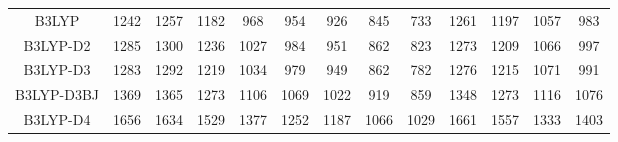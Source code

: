 \begin{table}[ht]
\begin{tabular}{ccccccccccccc}
B3LYP & 1242 & 1257 & 1182 & 968 & 954 & 926 & 845 & 733 & 1261 & 1197 & 1057 & 983 \\ 
B3LYP-D2 & 1285 & 1300 & 1236 & 1027 & 984 & 951 & 862 & 823 & 1273 & 1209 & 1066 & 997 \\ 
B3LYP-D3 & 1283 & 1292 & 1219 & 1034 & 979 & 949 & 862 & 782 & 1276 & 1215 & 1071 & 991 \\ 
B3LYP-D3BJ & 1369 & 1365 & 1273 & 1106 & 1069 & 1022 & 919 & 859 & 1348 & 1273 & 1116 & 1076 \\ 
B3LYP-D4 & 1656 & 1634 & 1529 & 1377 & 1252 & 1187 & 1066 & 1029 & 1661 & 1557 & 1333 & 1403 \\ 
\hline\hline
\end{tabular}
\end{table}